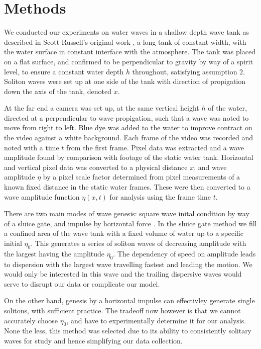 \documentclass[10pt, twocolumn]{revtex4}    %
\begin{document}
\section{Methods}
We conducted our experiments on water waves in a shallow depth wave tank as described in Scott Russell's original work \cite{russell}, a long tank of constant width, with the water surface in constant interface with the atmosphere.
The tank was placed on a flat surface, and confirmed to be perpendicular to gravity by way of a spirit level, to ensure a constant water depth $h$ throughout, satisfying assumption 2.
Soliton waves were set up at one side of the tank with direction of propigation down the axis of the tank, denoted $x$.

At the far end a camera was set up, at the same vertical height $h$ of the water, directed at a perpendicular to wave propigation, such that a wave was noted to move from right to left.
Blue dye was added to the water to improve contract on the video against a white background.
Each frame of the video was recorded and noted with a time $t$ from the first frame.
Pixel data was extracted and a wave amplitude found by comparison with footage of the static water tank.
Horizontal and vertical pixel data was converted to a physical distance $x$, and wave amplitude $\eta$ by a pixel scale factor determined from pixel measurements of a known fixed distance in the static water frames.
These were then converted to a wave amplitude function $\eta(x, t)$ for analysis using the frame time $t$.

There are two main modes of wave genesis: square wave inital condition by way of a sluice gate, and impulse by horizontal force \cite{russell}.
In the sluice gate method we fill a confined area of the wave tank with a fixed volume of water up to a specific initial $\eta_0$.
This generates a series of soliton waves of decreasing amplitude with the largest having the amplitude $\eta_0$.
The dependency of speed on amplitude leads to dispersion with the largest wave travelling fastest and leading the motion.
We would only be interested in this wave and the trailing dispersive waves would serve to disrupt our data or complicate our model.

On the other hand, genesis by a horizontal impulse can effectivley generate single solitons, with sufficient practice.
The tradeoff now however is that we cannot accurately choose $\eta_0$, and have to experimentally determine it for our analysis.
None the less, this method was selected due to its ability to consistently solitary waves for study and hence simplifying our data collection.
\end{document}
